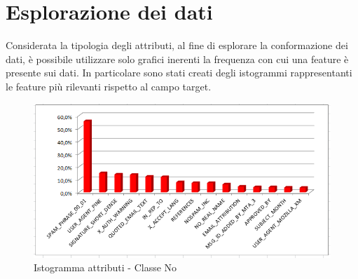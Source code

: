 %
%
%
%

\section{Esplorazione dei dati}
Considerata la tipologia degli attributi, al fine di esplorare la conformazione dei dati, è possibile utilizzare solo grafici inerenti la frequenza con cui una feature è presente sui dati. In particolare sono stati creati degli istogrammi rappresentanti le feature più rilevanti rispetto al campo target.

	\begin{figure}[hbtp]
		\centering
		\includegraphics[width=1\textwidth]{./images/Histogram_No.png}
		\caption{Istogramma attributi - Classe No}
		\label{NoHist}
	\end{figure}
	
